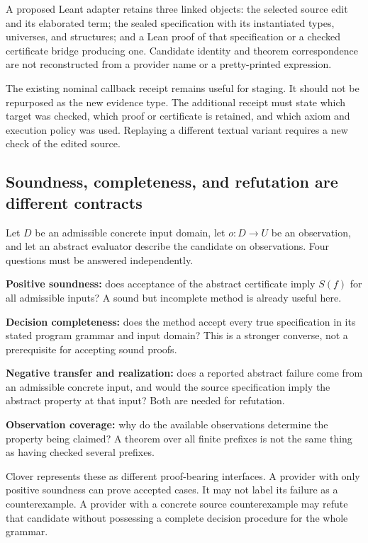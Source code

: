 \documentclass[11pt,a4paper]{article}
\theoremstyle{definition}
\theoremstyle{remark}
\begin{document}
A proposed Leant adapter retains three linked objects: the selected source edit
and its elaborated term; the sealed specification with its instantiated types,
universes, and structures; and a Lean proof of that specification or a checked
certificate bridge producing one. Candidate identity and theorem correspondence
are not reconstructed from a provider name or a pretty-printed expression.

The existing nominal callback receipt remains useful for staging. It should
not be repurposed as the new evidence type. The additional receipt must state
which target was checked, which proof or certificate is retained, and which
axiom and execution policy was used. Replaying a different textual variant
requires a new check of the edited source.

\subsection{Soundness, completeness, and refutation are different contracts}

Let $D$ be an admissible concrete input domain, let $o:D\to U$ be an observation,
and let an abstract evaluator describe the candidate on observations. Four
questions must be answered independently.

\textbf{Positive soundness:} does acceptance of the abstract certificate imply
$S(f)$ for all admissible inputs? A sound but incomplete method is already
useful here.

\textbf{Decision completeness:} does the method accept every true specification
in its stated program grammar and input domain? This is a stronger converse,
not a prerequisite for accepting sound proofs.

\textbf{Negative transfer and realization:} does a reported abstract failure
come from an admissible concrete input, and would the source specification
imply the abstract property at that input? Both are needed for refutation.

\textbf{Observation coverage:} why do the available observations determine the
property being claimed? A theorem over all finite prefixes is not the same
thing as having checked several prefixes.

Clover represents these as different proof-bearing interfaces. A provider with
only positive soundness can prove accepted cases. It may not label its failure
as a counterexample. A provider with a concrete source counterexample may
refute that candidate without possessing a complete decision procedure for the
whole grammar.
\end{document}
